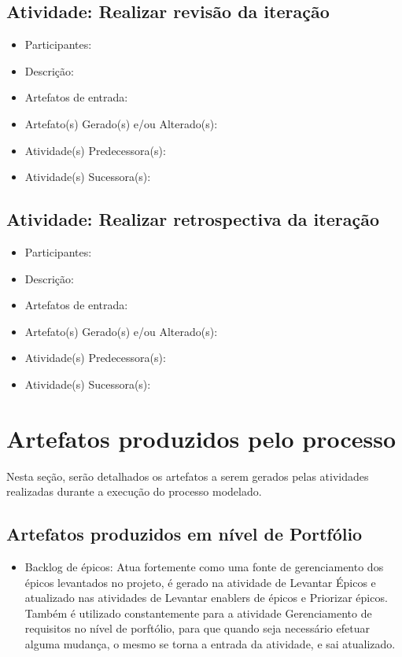 \subsection{Atividade: Realizar revisão da iteração}
\begin{itemize}
\item Participantes: 

\item Descrição: 

\item Artefatos de entrada: 

\item Artefato(s) Gerado(s) e/ou Alterado(s): 

\item Atividade(s) Predecessora(s): 
  
\item Atividade(s) Sucessora(s): 
\end{itemize}

\subsection{Atividade: Realizar retrospectiva da iteração}
\begin{itemize}
\item Participantes: 

\item Descrição: 

\item Artefatos de entrada: 

\item Artefato(s) Gerado(s) e/ou Alterado(s): 

\item Atividade(s) Predecessora(s): 
  
\item Atividade(s) Sucessora(s): 
\end{itemize}

\section{Artefatos produzidos pelo processo}

Nesta seção, serão detalhados os artefatos a serem gerados pelas atividades realizadas durante 
a execução do processo modelado.
\subsection{Artefatos produzidos em nível de Portfólio}
\begin{itemize}
\item Backlog de épicos: Atua fortemente como uma fonte de gerenciamento dos épicos levantados no projeto, é gerado na atividade de Levantar Épicos e atualizado nas atividades de Levantar enablers de épicos e Priorizar épicos. Também é utilizado constantemente para a atividade Gerenciamento de requisitos no nível de porftólio, para que quando seja necessário efetuar alguma mudança, o mesmo se torna a entrada da atividade, e sai atualizado.
\end{itemize}


